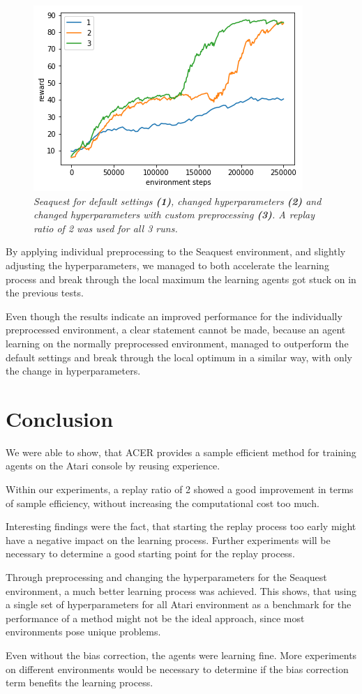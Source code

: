 \begin{figure}[h]
\includegraphics[scale=0.8]{bilder/seaquestprepro.png}
\caption{\textit{Seaquest for default settings \textbf{(1)}, changed hyperparameters \textbf{(2)} and changed hyperparameters with custom preprocessing \textbf{(3)}. A replay ratio of 2 was used for all 3 runs.}}
\end{figure}
\pagebreak
By applying individual preprocessing to the Seaquest environment, and slightly adjusting the hyperparameters, we managed to both accelerate the learning process and break through the local maximum the learning agents got stuck on in the previous tests.

Even though the results indicate an improved performance for the individually preprocessed environment, a clear statement cannot be made, because an agent learning on the normally preprocessed environment, managed to outperform the default settings and break through the local optimum in a similar way, with only the change in hyperparameters.

\pagebreak

\section{Conclusion}

We were able to show, that ACER provides a sample efficient method for training agents on the Atari console by reusing experience.

Within our experiments, a replay ratio of 2 showed a good improvement in terms of sample efficiency, without increasing the computational cost too much.

Interesting findings were the fact, that starting the replay process too early might have a negative impact on the learning process.
Further experiments will be necessary to determine a good starting point for the replay process.

Through preprocessing and changing the hyperparameters for the Seaquest environment, a much better learning process was achieved.
This shows, that using a single set of hyperparameters for all Atari environment as a benchmark for the performance of a method might not be the ideal approach, since most environments pose unique problems.

Even without the bias correction, the agents were learning fine. More experiments on different environments would be necessary to determine if the bias correction term benefits the learning process.
\pagebreak